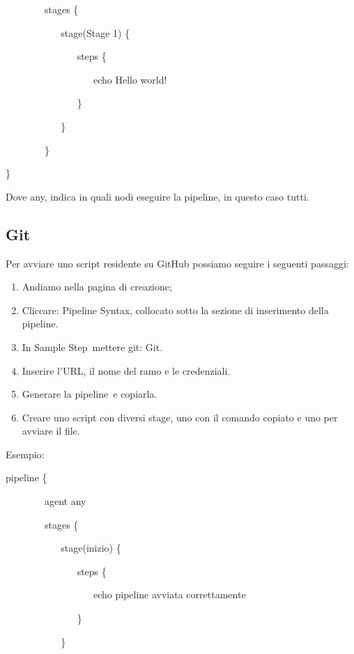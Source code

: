 \documentclass[
]{article}
\providecommand{\tightlist}{%
  \setlength{\itemsep}{0pt}\setlength{\parskip}{0pt}}
\begin{document}
{~~~~~~~~stages \{}

{~ ~ ~~~~~~~~stage(\textquotesingle Stage 1\textquotesingle) \{}

{~ ~ ~ ~ ~~~~~~~~steps \{}

{~ ~ ~ ~ ~ ~ ~~~~~~~~echo \textquotesingle Hello
world!\textquotesingle{}}

{~ ~ ~ ~ ~~~~~~~~\}}

{~ ~ ~~~~~~~~\}}

{~~~~~~~~\}}

{\}}

{}

{Dove }{any}{, indica in quali nodi eseguire la pipeline, in questo caso
tutti.}

\subsection{\texorpdfstring{{Git}}{Git}}\label{h.y8xexhd28d10}

{Per avviare uno script residente su GitHub possiamo seguire i seguenti
passaggi:}

\begin{enumerate}
\tightlist
\item
  {Andiamo nella pagina di creazione;}
\item
  {Cliccare: }{Pipeline Syntax}{, collocato sotto la sezione di
  inserimento della pipeline.}
\item
  {In }{Sample Step}{~mettere }{git: Git}{.}
\item
  {Inserire l'URL, il nome del ramo e le credenziali.}
\item
  {Generare }{la pipeline}{~e copiarla.}
\item
  {Creare uno script con diversi stage, uno con il comando copiato e uno
  per avviare il file.}
\end{enumerate}

{}

{Esempio:}

{pipeline \{}

{~~~~~~~~agent any}

{~~~~~~~~stages \{}

{~ ~ ~~~~~~~~stage(\textquotesingle inizio\textquotesingle) \{}

{~ ~ ~ ~ ~~~~~~~~steps \{}

{~ ~ ~ ~ ~ ~ ~~~~~~~~echo \textquotesingle pipeline avviata
correttamente\textquotesingle{}}

{~ ~ ~ ~ ~~~~~~~~\}}

{~ ~ ~~~~~~~~\}}
\end{document}
